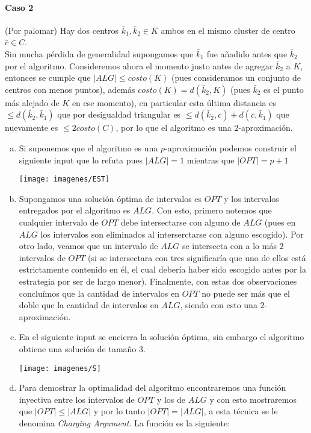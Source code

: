 \documentclass[dcc,uchile]{fcfmcourse}
\theoremstyle{plain}
\theoremstyle{definition}
\begin{document}
\begin{problems}
\begin{enumerate}[a)]
\paragraph{Caso 2} (Por palomar) Hay dos centros $\bar{k}_{1}, \bar{k}_2 \in K$ ambos en el mismo cluster de centro $\bar{c} \in C$.\\ 

Sin mucha pérdida de generalidad supongamos que $\bar{k}_{1}$ fue añadido antes que $\bar{k}_{2}$ por el algoritmo. Consideremos ahora el momento justo antes de agregar $\bar{k}_{2}$ a $K$, entonces se cumple que $|ALG| \le costo(K)$ (pues consideramos un conjunto de centros con menos puntos), además $costo(K) = d(\bar{k}_{2}, K)$ (pues $\bar{k}_{2}$ es el punto más alejado de $K$ en ese momento), en particular esta última distancia es $\le d(\bar{k}_{2}, \bar{k}_{1})$ que por desigualdad triangular es $\le d(\bar{k}_{2}, \bar{c}) + d(\bar{c}, \bar{k}_{1})$ que nuevamente es $\le 2costo(C)$, por lo que el algoritmo es una $2$-aproximación.
\end{enumerate}
\problem
\begin{enumerate}[a)]
    \item Si suponemos que el algoritmo es una $p$-aproximación podemos construir el siguiente input que lo refuta pues $|ALG| = 1$ mientras que $|OPT| = p+1$
    \begin{center}
        \texttt{[image: imagenes/EST]}
    \end{center}
    \item Supongamos una solución óptima de intervalos es $OPT$ y los intervalos entregados por el algoritmo es $ALG$. Con esto, primero notemos que cualquier intervalo de $OPT$ debe intersectarse con alguno de $ALG$ (pues en $ALG$ los intervalos son eliminados al interserctarse con alguno escogido). Por otro lado, veamos que un intervalo de $ALG$ se intersecta con a lo más $2$ intervalos de $OPT$ (si se intersectara con tres significaría que uno de ellos está estrictamente contenido en él, el cual debería haber sido escogido antes por la estrategia por ser de largo menor). Finalmente, con estas dos observaciones concluímos que la cantidad de intervalos en $OPT$ no puede ser más que el doble que la cantidad de intervalos en $ALG$, siendo con esto una $2$-aproximación.
    \item En el siguiente input se encierra la solución óptima, sin embargo el algoritmo obtiene una solución de tamaño 3.
    \begin{center}
        \texttt{[image: imagenes/S]}
    \end{center}
    \item Para demostrar la optimalidad del algoritmo encontraremos una función inyectiva entre los intervalos de $OPT$ y los de $ALG$ y con esto mostraremos que $|OPT| \le |ALG|$ y por lo tanto $|OPT| = |ALG|$, a esta técnica se le denomina \textit{Charging Argument}. La función es la siguiente:\\
    

\end{enumerate}
\end{problems}
\end{document}
